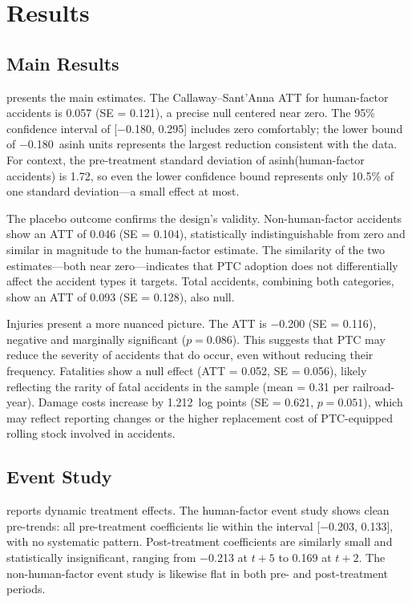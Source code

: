 \documentclass[12pt]{article}
\begin{document}
\section{Results}
\label{sec:results}

\subsection{Main Results}

 presents the main estimates. The Callaway--Sant'Anna ATT for human-factor accidents is 0.057 (SE = 0.121), a precise null centered near zero. The 95\% confidence interval of [$-$0.180, 0.295] includes zero comfortably; the lower bound of $-$0.180~asinh units represents the largest reduction consistent with the data. For context, the pre-treatment standard deviation of asinh(human-factor accidents) is 1.72, so even the lower confidence bound represents only 10.5\% of one standard deviation---a small effect at most.

The placebo outcome confirms the design's validity. Non-human-factor accidents show an ATT of 0.046 (SE = 0.104), statistically indistinguishable from zero and similar in magnitude to the human-factor estimate. The similarity of the two estimates---both near zero---indicates that PTC adoption does not differentially affect the accident types it targets. Total accidents, combining both categories, show an ATT of 0.093 (SE = 0.128), also null.

Injuries present a more nuanced picture. The ATT is $-$0.200 (SE = 0.116), negative and marginally significant ($p = 0.086$). This suggests that PTC may reduce the severity of accidents that do occur, even without reducing their frequency. Fatalities show a null effect (ATT = 0.052, SE = 0.056), likely reflecting the rarity of fatal accidents in the sample (mean = 0.31 per railroad-year). Damage costs increase by 1.212~log points (SE = 0.621, $p = 0.051$), which may reflect reporting changes or the higher replacement cost of PTC-equipped rolling stock involved in accidents.



\subsection{Event Study}

 reports dynamic treatment effects. The human-factor event study shows clean pre-trends: all pre-treatment coefficients lie within the interval [$-$0.203, 0.133], with no systematic pattern. Post-treatment coefficients are similarly small and statistically insignificant, ranging from $-$0.213 at $t+5$ to 0.169 at $t+2$. The non-human-factor event study is likewise flat in both pre- and post-treatment periods.
\end{document}

